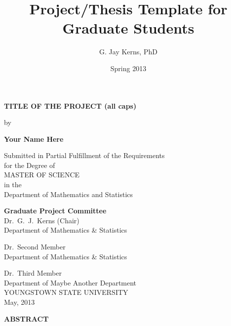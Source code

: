 \documentclass[11pt]{article}
\author{G. Jay Kerns, PhD}
\date{Spring 2013}
\title{Project/Thesis Template for Graduate Students}
\renewcommand{\maketitle}{}
\begin{document}
\maketitle

%

\newpage
\thispagestyle{empty}
\begin{center}
\textbf{TITLE OF THE PROJECT (all caps)} 

\vspace{0.25in}
by 
\vspace{0.25in}

\textbf{Your Name Here}

\vspace{1in}

Submitted in Partial Fulfillment of the Requirements\\
for the Degree of\\
\vspace{0.1in}
MASTER OF SCIENCE\\
\vspace{0.1in}
in the\\
Department of Mathematics and Statistics\\

\vspace{1in}

\textbf{Graduate Project Committee}\\
\bigskip
Dr.\ G.\ J.\ Kerns (Chair)\\
Department of Mathematics \& Statistics\\
\bigskip

Dr.\ Second Member\\
Department of Mathematics \& Statistics\\
\bigskip

Dr.\ Third Member \\
Department of Maybe Another Department\\

\vfill
YOUNGSTOWN STATE UNIVERSITY\\
May, 2013 
\end{center}

\newpage
{}
\setcounter{page}{2}
\begin{center}
\textbf{ABSTRACT} 
\end{center} \vspace{0.25in}
\end{document}
